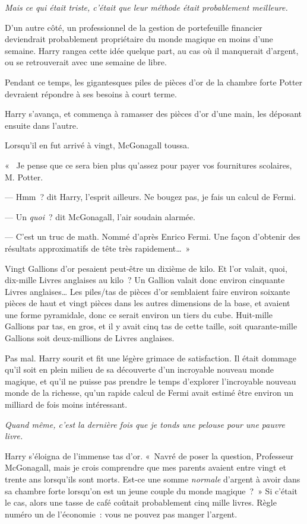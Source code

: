 \emph{Mais ce qui était triste, c'était que leur méthode était probablement meilleure.}

D'un autre côté, un professionnel de la gestion de portefeuille financier deviendrait probablement propriétaire du monde magique en moins d'une semaine. Harry rangea cette idée quelque part, au cas où il manquerait d'argent, ou se retrouverait avec une semaine de libre.

Pendant ce temps, les gigantesques piles de pièces d'or de la chambre forte Potter devraient répondre à ses besoins à court terme.

Harry s'avança, et commença à ramasser des pièces d'or d'une main, les déposant ensuite dans l'autre.

Lorsqu'il en fut arrivé à vingt, McGonagall toussa.

«~ Je pense que ce sera bien plus qu'assez pour payer vos fournitures scolaires, M. Potter.

--- Hmm~? dit Harry, l'esprit ailleurs. Ne bougez pas, je fais un calcul de Fermi.

--- Un \emph{quoi}~? dit McGonagall, l'air soudain alarmée.

--- C'est un truc de math. Nommé d'après Enrico Fermi. Une façon d'obtenir des résultats approximatifs de tête très rapidement…~»

Vingt Gallions d'or pesaient peut-être un dixième de kilo. Et l'or valait, quoi, dix-mille Livres anglaises au kilo~? Un Gallion valait donc environ cinquante Livres anglaises… Les piles/tas de pièces d'or semblaient faire environ soixante pièces de haut et vingt pièces dans les autres dimensions de la base, et avaient une forme pyramidale, donc ce serait environ un tiers du cube. Huit-mille Gallions par tas, en gros, et il y avait cinq tas de cette taille, soit quarante-mille Gallions soit deux-millions de Livres anglaises.

Pas mal. Harry sourit et fit une légère grimace de satisfaction. Il était dommage qu'il soit en plein milieu de sa découverte d'un incroyable nouveau monde magique, et qu'il ne puisse pas prendre le temps d'explorer l'incroyable nouveau monde de la richesse, qu'un rapide calcul de Fermi avait estimé être environ un milliard de fois moins intéressant.

\emph{Quand même, c'est la dernière fois que je tonds une pelouse pour une pauvre livre.}

Harry s'éloigna de l'immense tas d'or. «~Navré de poser la question, Professeur McGonagall, mais je crois comprendre que mes parents avaient entre vingt et trente ans lorsqu'ils sont morts. Est-ce une somme \emph{normale} d'argent à avoir dans sa chambre forte lorsqu'on est un jeune couple du monde magique~?~» Si c'était le cas, alors une tasse de café coûtait probablement cinq mille livres. Règle numéro un de l'économie~: vous ne pouvez pas manger l'argent.

